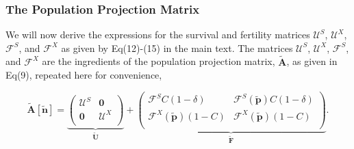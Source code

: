 \documentclass[11pt]{article}
\def\mbf#1{\mathbf{#1}}
\def\mcal#1{\mathcal{#1}}
\begin{document}
\subsubsection*{The Population Projection Matrix}
We will now derive the expressions for the survival and fertility matrices $\mcal{U}^S$, $\mcal{U}^X$, $\mcal{F}^S$, and $\mcal{F}^X$ as given by Eq(12)-(15) in the main text. The matrices $\mcal{U}^S$, $\mcal{U}^X$, $\mcal{F}^S$, and $\mcal{F}^X$ are the ingredients of the population projection matrix, $\tilde{\mbf{A}}$, as given in Eq(9), repeated here for convenience, 
\begin{linenomath*}
\begin{equation} \label{eq:Atilde_appendix}
	\tilde{\mbf{A}}[\tilde{\mbf{n}}] = 
			\underbrace{\left(
			\begin{array}{c|c}
				\mcal{U}^S & \mbf{0} \\ \hline
				\mbf{0} & \mcal{U}^X \\
			\end{array} \right)}_{\tilde{\mbf{U}}} + 
			\underbrace{\left(
			\begin{array}{c|c}
				\mcal{F}^S C(1 - \delta) & \mcal{F}^S(\tilde{\mbf{p}}) C(1 - \delta) \\ \hline
				\mcal{F}^X(\tilde{\mbf{p}}) (1 - C) & \mcal{F}^X(\tilde{\mbf{p}}) (1 - C)\\
			\end{array} \right)}_{\tilde{\mbf{F}}}.
\end{equation}
\end{linenomath*}
\end{document}
